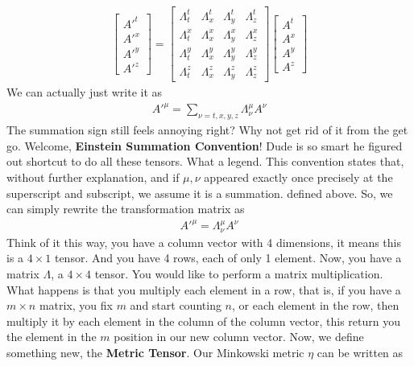 \documentclass[11pt,letterpaper]{book}
\newcommand{\etensor}[3]{#1_{#3}^{#2}}
\begin{document}
\begin{align}
\begin{bmatrix}
    A'^t \\
    A'^x \\
    A'^y \\
    A'^z
\end{bmatrix}
=
\begin{bmatrix}
    \Lambda^t_t & \Lambda^t_x & \Lambda^t_y & \Lambda^t_z \\
    \Lambda^x_t & \Lambda^x_x & \Lambda^x_y & \Lambda^x_z \\
    \Lambda^y_t & \Lambda^y_x & \Lambda^y_y & \Lambda^y_z \\
    \Lambda^z_t & \Lambda^z_x & \Lambda^z_y & \Lambda^z_z
\end{bmatrix}
\begin{bmatrix}
    A^t \\
    A^x \\
    A^y \\
    A^z
\end{bmatrix}
\end{align}
We can actually just write it as
\begin{align}
A'^{\mu} = \sum_{\nu=t,x,y,z} \etensor{\Lambda}{\mu}{\nu}A^\nu
\end{align}
The summation sign still feels annoying right? Why not get rid of it from the get go. Welcome, \textbf{Einstein Summation Convention}! Dude is so smart he figured out shortcut to do all these tensors. What a legend. This convention states that, without further explanation, and if $\mu,\nu$ appeared exactly once precisely at the superscript and subscript, we assume it is a summation. defined above. So, we can simply rewrite the transformation matrix as
\begin{align}
A'^{\mu} = \etensor{\Lambda}{\mu}{\nu}A^\nu
\end{align}
Think of it this way, you have a column vector with 4 dimensions, it means this is a $4\times 1$ tensor. And you have 4 rows, each of only 1 element. Now, you have a matrix $\Lambda$, a $4\times 4$ tensor. You would like to perform a matrix multiplication. What happens is that you multiply each element in a row, that is, if you have a $m\times n$ matrix, you fix $m$ and start counting $n$, or each element in the row, then multiply it by each element in the column of the column vector, this return you the element in the $m$ position in our new column vector.
Now, we define something new, the \textbf{Metric Tensor}. Our Minkowski metric $\eta$ can be written as
\end{document}
